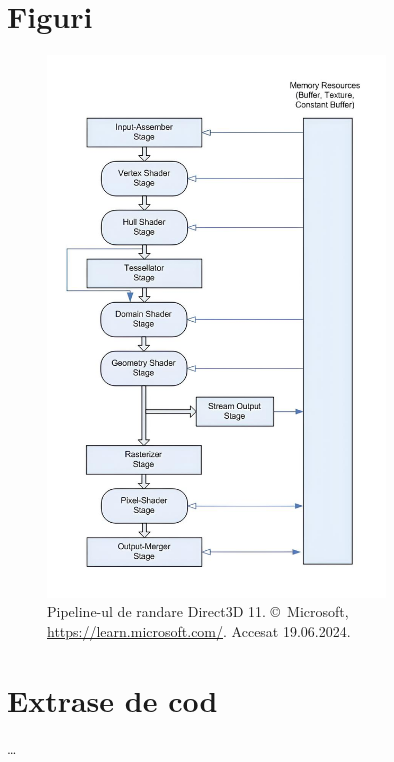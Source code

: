\documentclass[12pt,a4paper]{report}
\numberwithin{equation}{section} %
\begin{document}
\begin{appendices}
	\label{anexa}
	\chapter{Figuri}
	\begin{figure}[ht]
		\centering
		\includegraphics[width=0.8\textwidth]{pics/pipeline.jpg}
		\caption{Pipeline-ul de randare Direct3D 11. \copyright~Microsoft, \url{https://learn.microsoft.com/}. Accesat 19.06.2024.}
		\label{fig:pipeline}
	\end{figure}
	\chapter{Extrase de cod} %
	\ldots


\end{appendices}
\end{document}
